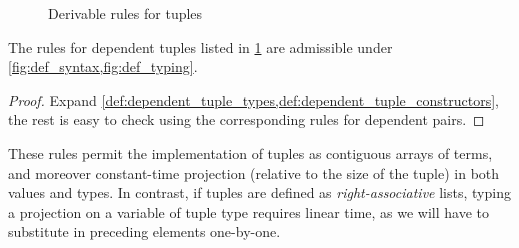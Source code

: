 \documentclass[twoside]{report}
\begin{document}
\begin{figure}[ht]
    \begin{prooftree}
    \end{prooftree}

    \begin{prooftree}
    \end{prooftree}

    \begin{prooftree}
    \end{prooftree}

    \caption{Derivable rules for tuples}
    \label{fig:tuple_rules}
\end{figure}

\begin{proposition}
    \label{thm:tuple_rules}
    The rules for dependent tuples listed in \cref{fig:tuple_rules} are admissible under \cref{fig:def_syntax,fig:def_typing}.
\end{proposition}

\begin{proof}
    Expand \cref{def:dependent_tuple_types,def:dependent_tuple_constructors}, the rest is easy to check using the corresponding rules for dependent pairs.
\end{proof}

These rules permit the implementation of tuples as contiguous arrays of terms, and moreover constant-time projection (relative to the size of the tuple) in both values and types. In contrast, if tuples are defined as \emph{right-associative} lists, typing a projection on a variable of tuple type requires linear time, as we will have to substitute in preceding elements one-by-one.
\end{document}
